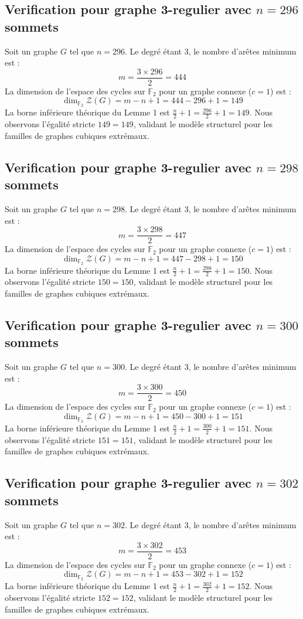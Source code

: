 \documentclass[11pt,a4paper]{article}
\begin{document}
\subsection{Verification pour graphe 3-regulier avec $n=296$ sommets}
Soit un graphe $G$ tel que $n = 296$. Le degré étant 3, le nombre d'arêtes minimum est :
$$ m = \frac{3 \times 296}{2} = 444 $$
La dimension de l'espace des cycles sur $\mathbb{F}_2$ pour un graphe connexe ($c=1$) est :
$$ \dim_{\mathbb{F}_2} \mathcal{Z}(G) = m - n + 1 = 444 - 296 + 1 = 149 $$
La borne inférieure théorique du Lemme 1 est $\frac{n}{2} + 1 = \frac{296}{2} + 1 = 149$.
Nous observons l'égalité stricte $149 = 149$, validant le modèle structurel pour les familles de graphes cubiques extrémaux.

\subsection{Verification pour graphe 3-regulier avec $n=298$ sommets}
Soit un graphe $G$ tel que $n = 298$. Le degré étant 3, le nombre d'arêtes minimum est :
$$ m = \frac{3 \times 298}{2} = 447 $$
La dimension de l'espace des cycles sur $\mathbb{F}_2$ pour un graphe connexe ($c=1$) est :
$$ \dim_{\mathbb{F}_2} \mathcal{Z}(G) = m - n + 1 = 447 - 298 + 1 = 150 $$
La borne inférieure théorique du Lemme 1 est $\frac{n}{2} + 1 = \frac{298}{2} + 1 = 150$.
Nous observons l'égalité stricte $150 = 150$, validant le modèle structurel pour les familles de graphes cubiques extrémaux.

\subsection{Verification pour graphe 3-regulier avec $n=300$ sommets}
Soit un graphe $G$ tel que $n = 300$. Le degré étant 3, le nombre d'arêtes minimum est :
$$ m = \frac{3 \times 300}{2} = 450 $$
La dimension de l'espace des cycles sur $\mathbb{F}_2$ pour un graphe connexe ($c=1$) est :
$$ \dim_{\mathbb{F}_2} \mathcal{Z}(G) = m - n + 1 = 450 - 300 + 1 = 151 $$
La borne inférieure théorique du Lemme 1 est $\frac{n}{2} + 1 = \frac{300}{2} + 1 = 151$.
Nous observons l'égalité stricte $151 = 151$, validant le modèle structurel pour les familles de graphes cubiques extrémaux.

\subsection{Verification pour graphe 3-regulier avec $n=302$ sommets}
Soit un graphe $G$ tel que $n = 302$. Le degré étant 3, le nombre d'arêtes minimum est :
$$ m = \frac{3 \times 302}{2} = 453 $$
La dimension de l'espace des cycles sur $\mathbb{F}_2$ pour un graphe connexe ($c=1$) est :
$$ \dim_{\mathbb{F}_2} \mathcal{Z}(G) = m - n + 1 = 453 - 302 + 1 = 152 $$
La borne inférieure théorique du Lemme 1 est $\frac{n}{2} + 1 = \frac{302}{2} + 1 = 152$.
Nous observons l'égalité stricte $152 = 152$, validant le modèle structurel pour les familles de graphes cubiques extrémaux.
\end{document}
